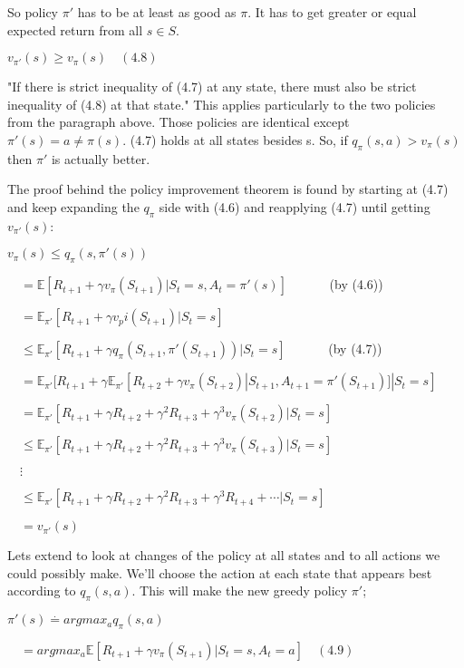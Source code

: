 \documentclass[11pt]{article}
\begin{document}
So policy \(\pi'\) has to be at least as good as \(\pi\). It has to get
greater or equal expected return from all \(s \in S\).

\(v_{\pi'}(s) \geq v_\pi(s) \quad (4.8)\)

"If there is strict inequality of (4.7) at any state, there must also be
strict inequality of (4.8) at that state." This applies particularly to
the two policies from the paragraph above. Those policies are identical
except \(\pi'(s) = a \neq \pi(s)\). (4.7) holds at all states besides s.
So, if \(q_\pi(s, a) > v_\pi(s)\) then \(\pi'\) is actually better.

The proof behind the policy improvement theorem is found by starting at
(4.7) and keep expanding the \(q_\pi\) side with (4.6) and reapplying
(4.7) until getting \(v_{\pi'}(s)\):

\(v_\pi(s) \leq q_\pi(s, \pi'(s))\)

\(\quad = \mathbb{E}[R_{t+1} + \gamma v_\pi(S_{t+1}) | S_t = s, A_t = \pi'(s)] \quad \quad \quad\)
(by (4.6))

\(\quad = \mathbb{E}_{\pi'}[R_{t+1} + \gamma v_pi(S_{t+1}) | S_t = s]\)

\(\quad \leq \mathbb{E}_{\pi'}[R_{t+1} + \gamma q_\pi(S_{t+1}, \pi'(S_{t+1})) | S_t = s] \quad \quad \quad\)
(by (4.7))

\(\quad = \mathbb{E}_{\pi'}[R_{t+1} + \gamma \mathbb{E}_{\pi'}[R_{t+2} + \gamma v_\pi(S_{t+2}) | S_{t+1}, A_{t+1} = \pi'(S_{t+1})] | S_t = s]\)

\(\quad = \mathbb{E}_{\pi'}[R_{t+1} + \gamma R_{t+2} + \gamma^2 R_{t+3} + \gamma^3 v_\pi(S_{t+2}) | S_t = s]\)

\(\quad \leq \mathbb{E}_{\pi'}[R_{t+1} + \gamma R_{t+2} + \gamma^2 R_{t+3} + \gamma^3 v_\pi(S_{t+3}) | S_t = s]\)

\(\quad \vdots\)

\(\quad \leq \mathbb{E}_{\pi'}[R_{t+1} + \gamma R_{t+2} + \gamma^2 R_{t+3} + \gamma^3 R_{t+4} + \dotsb | S_t = s]\)

\(\quad = v_{\pi'}(s)\)

    Lets extend to look at changes of the policy at all states and to all
actions we could possibly make. We'll choose the action at each state
that appears best according to \(q_\pi(s, a)\). This will make the new
greedy policy \(\pi'\);

\(\pi'(s) \stackrel{.}{=} argmax_a q_\pi(s, a)\)

\(\quad = argmax_a \mathbb{E}[R_{t+1} + \gamma v_\pi(S_{t+1}) | S_t = s, A_t = a] \quad (4.9)\)
\end{document}

